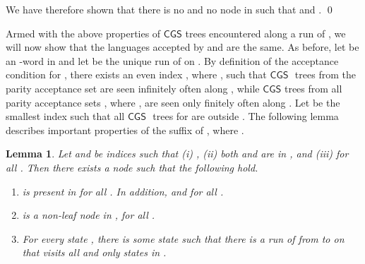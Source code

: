 \documentclass[3p]{elsarticle}
\newtheorem{lemma}[theorem]{Lemma}
\newcommand{\CGS}{\ensuremath{\textsf{CGS }}}
\begin{document}
We have therefore shown that there is no  and no node  in
 such that  and .
\qed


Armed with the above properties of \CGS trees encountered along a run
of , we will now show that the languages accepted by  and
 are the same.  As before, let  be an -word in
 and let  be the unique run of  on
.  By definition of the acceptance condition for , there
exists an even index , where , such that \CGS
trees from the parity acceptance set  are seen infinitely
often along , while \CGS trees from all parity acceptance sets
, where , are seen only finitely often along
.  Let  be the smallest index  such that all \CGS
trees  for  are outside .
The following lemma describes important properties of the suffix  of , where .

\begin{lemma}\label{greentogreen}
Let  and  be indices such that (i) , (ii)
both  and  are in , and (iii)  for all .  Then there exists a
node  such that the following hold.
\begin{enumerate}
\item  is present in  for all .
  In addition,  and  for
  all .
  
\item  is a non-leaf node in , for all .

\item For every state , there is some state  such that there is a run of  from  to 
  on  that visits all and only states in
  .
\end{enumerate}
\end{lemma}
\end{document}
